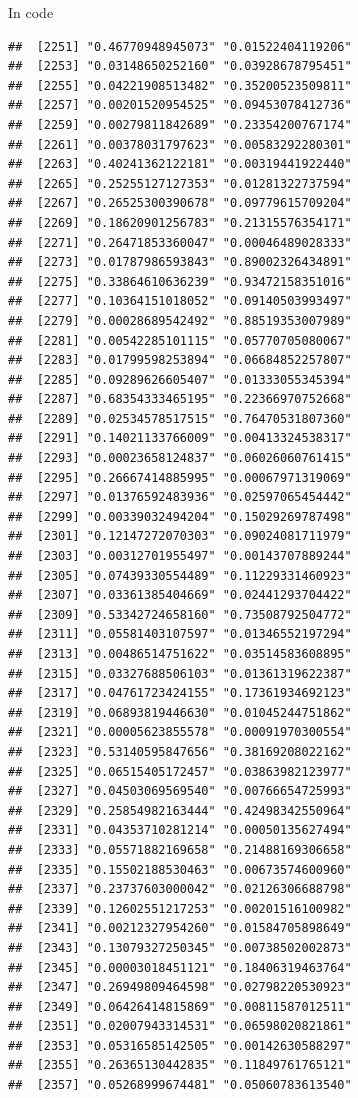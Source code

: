 \documentclass[ignorenonframetext,]{beamer}
\begin{document}
\begin{frame}[fragile]{In code}
\begin{verbatim}
##  [2251] "0.46770948945073" "0.01522404119206"
##  [2253] "0.03148650252160" "0.03928678795451"
##  [2255] "0.04221908513482" "0.35200523509811"
##  [2257] "0.00201520954525" "0.09453078412736"
##  [2259] "0.00279811842689" "0.23354200767174"
##  [2261] "0.00378031797623" "0.00583292280301"
##  [2263] "0.40241362122181" "0.00319441922440"
##  [2265] "0.25255127127353" "0.01281322737594"
##  [2267] "0.26525300390678" "0.09779615709204"
##  [2269] "0.18620901256783" "0.21315576354171"
##  [2271] "0.26471853360047" "0.00046489028333"
##  [2273] "0.01787986593843" "0.89002326434891"
##  [2275] "0.33864610636239" "0.93472158351016"
##  [2277] "0.10364151018052" "0.09140503993497"
##  [2279] "0.00028689542492" "0.88519353007989"
##  [2281] "0.00542285101115" "0.05770705080067"
##  [2283] "0.01799598253894" "0.06684852257807"
##  [2285] "0.09289626605407" "0.01333055345394"
##  [2287] "0.68354333465195" "0.22366970752668"
##  [2289] "0.02534578517515" "0.76470531807360"
##  [2291] "0.14021133766009" "0.00413324538317"
##  [2293] "0.00023658124837" "0.06026060761415"
##  [2295] "0.26667414885995" "0.00067971319069"
##  [2297] "0.01376592483936" "0.02597065454442"
##  [2299] "0.00339032494204" "0.15029269787498"
##  [2301] "0.12147272070303" "0.09024081711979"
##  [2303] "0.00312701955497" "0.00143707889244"
##  [2305] "0.07439330554489" "0.11229331460923"
##  [2307] "0.03361385404669" "0.02441293704422"
##  [2309] "0.53342724658160" "0.73508792504772"
##  [2311] "0.05581403107597" "0.01346552197294"
##  [2313] "0.00486514751622" "0.03514583608895"
##  [2315] "0.03327688506103" "0.01361319622387"
##  [2317] "0.04761723424155" "0.17361934692123"
##  [2319] "0.06893819446630" "0.01045244751862"
##  [2321] "0.00005623855578" "0.00091970300554"
##  [2323] "0.53140595847656" "0.38169208022162"
##  [2325] "0.06515405172457" "0.03863982123977"
##  [2327] "0.04503069569540" "0.00766654725993"
##  [2329] "0.25854982163444" "0.42498342550964"
##  [2331] "0.04353710281214" "0.00050135627494"
##  [2333] "0.05571882169658" "0.21488169306658"
##  [2335] "0.15502188530463" "0.00673574600960"
##  [2337] "0.23737603000042" "0.02126306688798"
##  [2339] "0.12602551217253" "0.00201516100982"
##  [2341] "0.00212327954260" "0.01584705898649"
##  [2343] "0.13079327250345" "0.00738502002873"
##  [2345] "0.00003018451121" "0.18406319463764"
##  [2347] "0.26949809464598" "0.02798220530923"
##  [2349] "0.06426414815869" "0.00811587012511"
##  [2351] "0.02007943314531" "0.06598020821861"
##  [2353] "0.05316585142505" "0.00142630588297"
##  [2355] "0.26365130442835" "0.11849761765121"
##  [2357] "0.05268999674481" "0.05060783613540"

\end{verbatim}
\end{frame}
\end{document}
